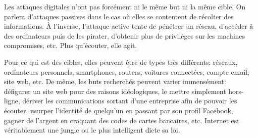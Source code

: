 \documentclass[article, french]{yReport}
\begin{document}
	Les attaques digitales n'ont pas forcément ni le même but ni la même cible.
	On parlera d'attaques passives dans le cas où elles se contentent de récolter des informations.
	À l'inverse, l'attaque active tente de pénétrer un réseau, d'accéder à des ordinateurs puis de les pirater, d'obtenir plus de privilèges sur les machines compromises, etc.
	Plus qu'écouter, elle agit.
	
	Pour ce qui est des cibles, elles peuvent être de types très différents: réseaux, ordinateurs personnels, smartphones, routers, voitures connectées, compte email, site web, etc.
	De même, les buts recherchés peuvent varier immensément: défigurer un site web pour des raisons idéologiques, le mettre simplement hors-ligne, dériver les communications sortant d'une entreprise afin de pouvoir les écouter, usurper l'identité de quelqu'un en passant par son profil Facebook, gagner de l'argent en craquant des codes de cartes bancaires, etc.
	Internet est véritablement une jungle ou le plus intelligent dicte sa loi.
	
\end{document}
